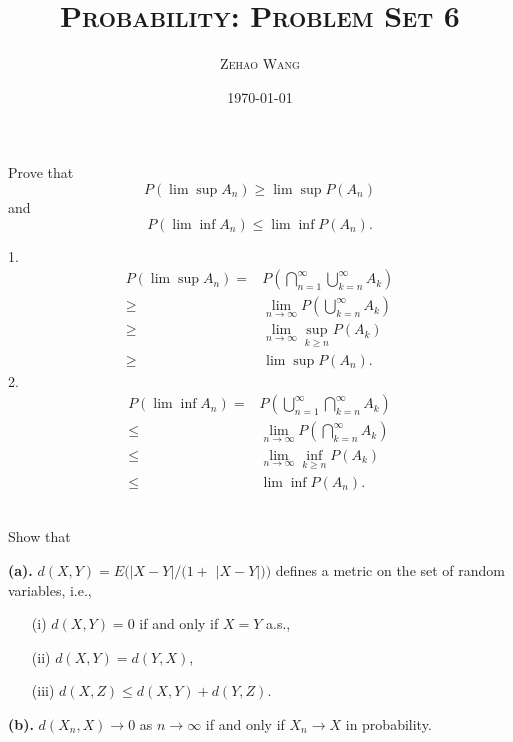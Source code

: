 \documentclass[en, normal, 11pt, black]{elegantnote}
\title{\textsc{Probability: Problem Set 6}}
\author{\textsc{Zehao Wang}}
\date{\today}
\newenvironment{exercise}[1]{\begin{tcolorbox}[colback=black!15, colframe=black!80, breakable, title=#1]}{\end{tcolorbox}}
\renewenvironment{proof}{\begin{tcolorbox}[colback=white, colframe=black!50, breakable, title=Proof. ]\setlength{\parskip}{0.8em}}{\,\\\rightline{$\square$}\end{tcolorbox}}
\begin{document}
    \maketitle
    \begin{exercise}{2.3.1}
        Prove that 
        \[
            P(\lim \sup A_n) \geqslant \lim \sup P(A_n)
        \]
        and
        \[
            P(\lim \inf A_n) \leqslant \lim \inf P(A_n). 
        \]
    \end{exercise}

    \begin{proof}
        1. 
        \[
            \begin{aligned}
                P(\lim\sup A_n)=&P\left(\bigcap_{n=1}^\infty\bigcup_{k=n}^\infty A_k\right)\\
                \geqslant&\lim_{n\to\infty}P\left(\bigcup_{k=n}^\infty A_k\right)\\
                \geqslant&\lim_{n\to\infty}\sup_{k\geqslant n}P(A_k)\\
                \geqslant&\lim\sup P(A_n). 
            \end{aligned}
        \]
        2. 
        \[
            \begin{aligned}
                P(\lim\inf A_n)=&P\left(\bigcup_{n=1}^\infty\bigcap_{k=n}^\infty A_k\right)\\
                \leqslant&\lim_{n\to\infty}P\left(\bigcap_{k=n}^\infty A_k\right)\\
                \leqslant&\lim_{n\to\infty}\inf_{k\geqslant n}P(A_k)\\
                \leqslant&\lim\inf P(A_n). 
            \end{aligned}
        \]
        \vspace*{-25pt}
    \end{proof}

    \begin{exercise}{2.3.6. Metric for convergence in probability. }
        Show that
        
        {\bfseries(a).} $d(X, Y)=E(|X-Y| /(1+$ $|X-Y|))$ defines a metric on the set of random variables, i.e., 
        \begin{itemize}
            \item[(i)] $d(X, Y)=0$ if and only if $X=Y$ a.s., 
            \item[(ii)] $d(X, Y)=d(Y, X)$, 
            \item[(iii)] $d(X, Z) \leq d(X, Y)+d(Y, Z)$. 
        \end{itemize}
        {\bfseries(b).} $d\left(X_{n}, X\right) \rightarrow 0$ as $n \rightarrow \infty$ if and only if $X_{n} \rightarrow X$ in probability. 
    \end{exercise}
\end{document}
